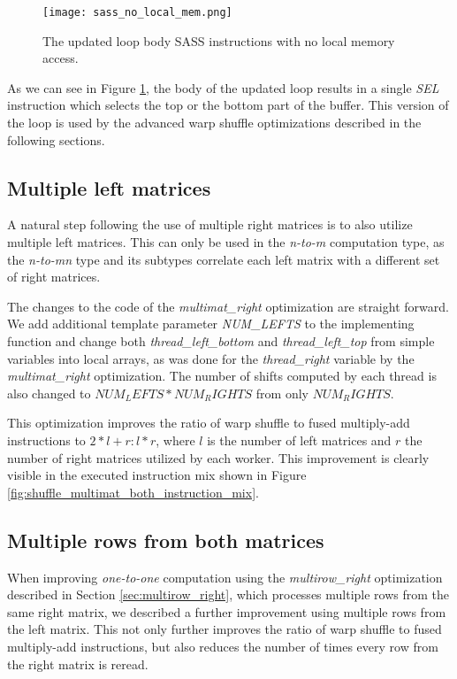 \begin{figure}[ht]
	\centering
	\texttt{[image: sass\_no\_local\_mem.png]}
	\caption{The updated loop body SASS instructions with no local memory access.}
	\label{fig:sass_no_local_memory}
\end{figure}

As we can see in Figure \ref{fig:sass_no_local_memory}, the body of the updated loop results in a single \textit{SEL} instruction which selects the top or the bottom part of the buffer. This version of the loop is used by the advanced warp shuffle optimizations described in the following sections.

\subsection{Multiple left matrices}
\label{sec:multimat_both}

A natural step following the use of multiple right matrices is to also utilize multiple left matrices. This can only be used in the \textit{n-to-m} computation type, as the \textit{n-to-mn} type and its subtypes correlate each left matrix with a different set of right matrices.

The changes to the code of the \textit{multimat\_right} optimization are straight forward. We add additional template parameter \textit{NUM\_LEFTS} to the implementing function and change both \textit{thread\_left\_bottom} and \textit{thread\_left\_top} from simple variables into local arrays, as was done for the \textit{thread\_right} variable by the \textit{multimat\_right} optimization. The number of shifts computed by each thread is also changed to $NUM_LEFTS * NUM_RIGHTS$ from only $NUM_RIGHTS$. 


This optimization improves the ratio of warp shuffle to fused multiply-add instructions to $ 2 * l + r : l * r$, where $l$ is the number of left matrices and $r$ the number of right matrices utilized by each worker. This improvement is clearly visible in the executed instruction mix shown in Figure \ref{fig:shuffle_multimat_both_instruction_mix}. 

\subsection{Multiple rows from both matrices}
\label{sec:multirow_both}

When improving \textit{one-to-one} computation using the \textit{multirow\_right} optimization described in Section \ref{sec:multirow_right}, which processes multiple rows from the same right matrix, we described a further improvement using multiple rows from the left matrix. This not only further improves the ratio of warp shuffle to fused multiply-add instructions, but also reduces the number of times every row from the right matrix is reread. 

